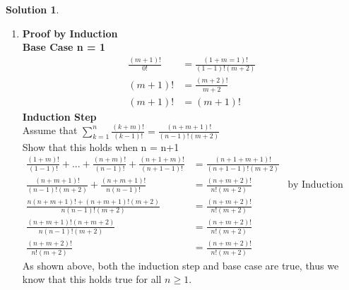 \documentclass{article}
\theoremstyle{definition}
\newtheorem*{solution}{Solution}
\begin{document}
\begin{solution}
\begin{enumerate}[label = \alph*)]
    \item
    \textbf{Proof by Induction}\\
    \textbf{Base Case n = 1}
    \begin{align*}
        \frac{(m+1)!}{0!} &= \frac{(1+m=1)!}{(1-1)!(m+2)}\\
        (m+1)! &= \frac{(m+2)!}{m+2}\\
        (m+1)! &= (m+1)!
    \end{align*}
    \textbf{Induction Step}\\
    Assume that $\sum_{k=1}^n \frac{(k+m)!}{(k-1)!} = \frac{(n+m+1)!}{(n-1)!(m+2)}$\\
    Show that this holds when n = n+1
    \begin{align*}
        \frac{(1+m)!}{(1-1)!} + ... + \frac{(n+m)!}{(n-1)!} + \frac{(n+1+m)!}{(n+1-1)!} &= \frac{(n+1+m+1)!}{(n+1-1)!(m+2)}\\
        \frac{(n+m+1)!}{(n-1)!(m+2)} + \frac{(n+m+1)!}{n(n-1)!} &= \frac{(n+m+2)!}{n!(m+2)} &\text{by Induction Hypothesis}\\
        \frac{n(n+m+1)!+(n+m+1)!(m+2)}{n(n-1)!(m+2)} &= \frac{(n+m+2)!}{n!(m+2)}\\
        \frac{(n+m+1)!(n+m+2)}{n(n-1)!(m+2)} &= \frac{(n+m+2)!}{n!(m+2)}\\
        \frac{(n+m+2)!}{n!(m+2)} &= \frac{(n+m+2)!}{n!(m+2)}
    \end{align*}
    As shown above, both the induction step and base case are true, thus we know that this holds true for all $n\ge 1$.
    

\end{enumerate}
\end{solution}
\end{document}
